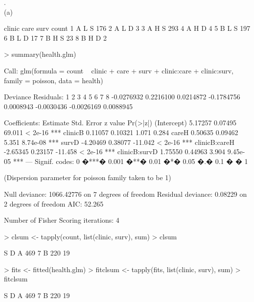 \documentclass[a4paper,11pt]{article}
\begin{document}
.\\
(a)
\begin{small}
\begin{Schunk}
\begin{Soutput}
  clinic care surv count
1      A    L    S   176
2      A    L    D     3
3      A    H    S   293
4      A    H    D     4
5      B    L    S   197
6      B    L    D    17
7      B    H    S    23
8      B    H    D     2
\end{Soutput}
\end{Schunk}

\begin{Schunk}
\begin{Sinput}
> summary(health.glm)
\end{Sinput}
\begin{Soutput}
Call:
glm(formula = count ~ clinic + care + surv + clinic:care + clinic:surv, 
    family = poisson, data = health)

Deviance Residuals: 
         1           2           3           4           5           6           7           8  
-0.0276932   0.2216100   0.0214872  -0.1784756   0.0008943  -0.0030436  -0.0026169   0.0088945  

Coefficients:
              Estimate Std. Error z value Pr(>|z|)    
(Intercept)    5.17257    0.07495  69.011  < 2e-16 ***
clinicB        0.11057    0.10321   1.071    0.284    
careH          0.50635    0.09462   5.351 8.74e-08 ***
survD         -4.20469    0.38077 -11.042  < 2e-16 ***
clinicB:careH -2.65345    0.23157 -11.458  < 2e-16 ***
clinicB:survD  1.75550    0.44963   3.904 9.45e-05 ***
---
Signif. codes:  0 �***� 0.001 �**� 0.01 �*� 0.05 �.� 0.1 � � 1 

(Dispersion parameter for poisson family taken to be 1)

    Null deviance: 1066.42776  on 7  degrees of freedom
Residual deviance:    0.08229  on 2  degrees of freedom
AIC: 52.265

Number of Fisher Scoring iterations: 4
\end{Soutput}
\begin{Sinput}
> clsum <- tapply(count, list(clinic, surv), sum)
> clsum
\end{Sinput}
\begin{Soutput}
    S  D
A 469  7
B 220 19
\end{Soutput}
\begin{Sinput}
> fits <- fitted(health.glm)
> fitclsum <- tapply(fits, list(clinic, surv), sum)
> fitclsum
\end{Sinput}
\begin{Soutput}
    S  D
A 469  7
B 220 19
\end{Soutput}
\end{Schunk}
\end{small}
\end{document}
